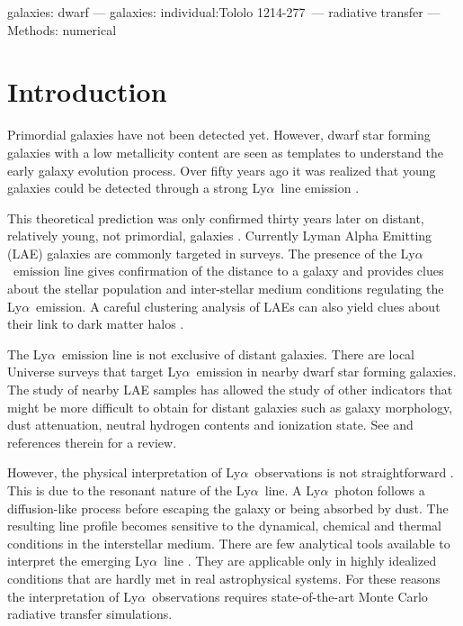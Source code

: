 \documentclass[a4paper,fleqn,usenatbib]{mnras}
\newcommand{\tol}{Tololo 1214-277}
\newcommand{\lya}{\ifmmode{{\rm Ly}\alpha}\else Ly$\alpha$\ \fi}
\begin{document}
\begin{keywords}
galaxies: dwarf --- galaxies: individual:\tol\ --- radiative transfer --- Methods: numerical 
\end{keywords}



\section{Introduction}
\label{sec:introduction}

Primordial galaxies have not been detected yet. 
However, dwarf star forming galaxies with a low metallicity content
are seen as templates to understand the early galaxy evolution process. 
Over fifty years ago it was realized that young galaxies could be
detected through a strong \lya line emission \citep{PartridgePeebles}.    

This theoretical prediction was only confirmed thirty years later on
distant, relatively young, not primordial, galaxies \citep{1998ApJ...498L..93D}.
Currently Lyman Alpha Emitting (LAE) galaxies are commonly targeted
in surveys. 
The presence of the \lya emission line gives confirmation of
the distance to a galaxy and provides clues about the stellar
population and inter-stellar medium conditions regulating the
\lya emission.
A careful clustering analysis of LAEs can also yield clues about their link
to dark matter halos
\citep{2004AJ....128.2073H,2007ApJ...671..278G,2007ApJ...668...15K,2008MNRAS.391.1589O,2010MNRAS.409..184P,2013MNRAS.431.1777G,2016ApJ...828....5M}. 

The \lya emission line is not exclusive of distant galaxies. 
There are local Universe surveys that target \lya emission in nearby
dwarf star forming galaxies.
The study of nearby LAE samples has allowed the study of other
indicators that might be more difficult to obtain for distant galaxies
such as galaxy morphology, dust attenuation, neutral hydrogen contents and
ionization state. See \cite{Hayes15} and references therein for a review.

However, the physical interpretation of \lya observations is
not straightforward \citep{LARS,2015ApJ...805...14R}. 
This is due to the resonant nature of the \lya line. 
A \lya photon follows a diffusion-like process before escaping
the galaxy or being absorbed by dust. 
The resulting line profile becomes sensitive to the dynamical, chemical
and thermal conditions in the interstellar medium. 
There are few analytical tools available to interpret the
emerging \lya line
\citep{Harrington73,1991ApJ...370L..85N,LoebRybicki,2006ApJ...645..792T}. 
They are applicable only in highly idealized conditions that
are hardly met in real astrophysical systems. 
For these reasons the interpretation of \lya observations
requires state-of-the-art Monte Carlo radiative transfer simulations.   
\end{document}
